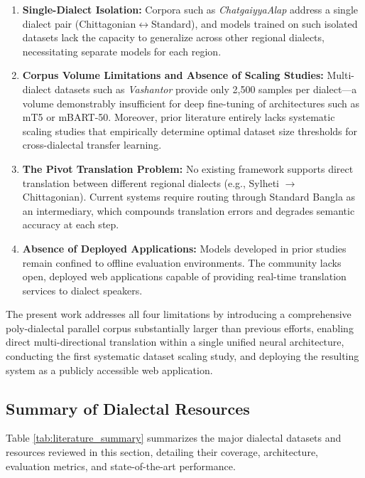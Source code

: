 \documentclass[12pt,a4paper]{article}
\begin{document}
\begin{enumerate}[leftmargin=*]
    \item \textbf{Single-Dialect Isolation:} Corpora such as \textit{ChatgaiyyaAlap} address a single dialect pair (Chittagonian$\leftrightarrow$Standard), and models trained on such isolated datasets lack the capacity to generalize across other regional dialects, necessitating separate models for each region.
    \item \textbf{Corpus Volume Limitations and Absence of Scaling Studies:} Multi-dialect datasets such as \textit{Vashantor} provide only 2,500 samples per dialect---a volume demonstrably insufficient for deep fine-tuning of architectures such as mT5 or mBART-50. Moreover, prior literature entirely lacks systematic scaling studies that empirically determine optimal dataset size thresholds for cross-dialectal transfer learning.
    \item \textbf{The Pivot Translation Problem:} No existing framework supports direct translation between different regional dialects (e.g., Sylheti $\rightarrow$ Chittagonian). Current systems require routing through Standard Bangla as an intermediary, which compounds translation errors and degrades semantic accuracy at each step.
    \item \textbf{Absence of Deployed Applications:} Models developed in prior studies remain confined to offline evaluation environments. The community lacks open, deployed web applications capable of providing real-time translation services to dialect speakers.
\end{enumerate}

The present work addresses all four limitations by introducing a comprehensive poly-dialectal parallel corpus substantially larger than previous efforts, enabling direct multi-directional translation within a single unified neural architecture, conducting the first systematic dataset scaling study, and deploying the resulting system as a publicly accessible web application.


\subsection{Summary of Dialectal Resources}
Table \ref{tab:literature_summary} summarizes the major dialectal datasets and resources reviewed in this section, detailing their coverage, architecture, evaluation metrics, and state-of-the-art performance.
\end{document}
